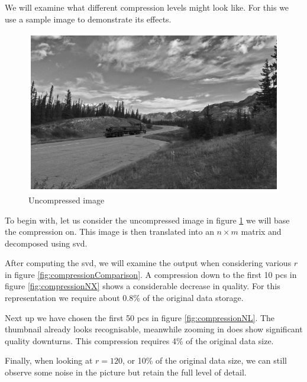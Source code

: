 We will examine what different compression levels might look like.
For this we use a sample image to demonstrate its effects.

\begin{figure}[ht]
    \centering
    \includegraphics[width=0.725\linewidth]{external_content/media/compression_example/uncompressed.png}
    \captionsetup{justification=centering}
    \caption{Uncompressed image}
    \label{fig:uncompressed}
\end{figure}
\vspace{-2mm}

To begin with, let us consider the uncompressed image in figure \ref{fig:uncompressed} we will base the compression on.
This image is then translated into an $n \times m$ matrix and decomposed using \gls{svd}.

After computing the \gls{svd}, we will examine the output when considering various $r$  in figure \ref{fig:compressionComparison}.
A compression down to the first 10 \glspl{pc} in figure \ref{fig:compressionNX} shows a considerable decrease in quality.
For this representation we require about 0.8\% of the original data storage.
\medskip

Next up we have chosen the first 50 \glspl{pc} in figure \ref{fig:compressionNL}.
The thumbnail already looks recognisable, meanwhile zooming in does show significant quality downturns.
This compression requires 4\% of the original data size.

Finally, when looking at $r=120$, or 10\% of the original data size, we can still observe some noise in the picture but retain the full level of detail.



